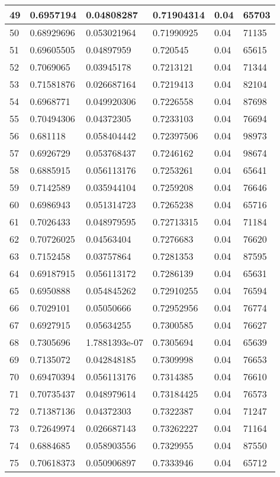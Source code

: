 \begin{longtable}{|l|l|l|l|l|l|}
49 & 0.6957194 & 0.04808287 & 0.71904314 & 0.04 & 65703 \\ \hline 
50 & 0.68929696 & 0.053021964 & 0.71990925 & 0.04 & 71135 \\ \hline 
51 & 0.69605505 & 0.04897959 & 0.720545 & 0.04 & 65615 \\ \hline 
52 & 0.7069065 & 0.03945178 & 0.7213121 & 0.04 & 71344 \\ \hline 
53 & 0.71581876 & 0.026687164 & 0.7219413 & 0.04 & 82104 \\ \hline 
54 & 0.6968771 & 0.049920306 & 0.7226558 & 0.04 & 87698 \\ \hline 
55 & 0.70494306 & 0.04372305 & 0.7233103 & 0.04 & 76694 \\ \hline 
56 & 0.681118 & 0.058404442 & 0.72397506 & 0.04 & 98973 \\ \hline 
57 & 0.6926729 & 0.053768437 & 0.7246162 & 0.04 & 98674 \\ \hline 
58 & 0.6885915 & 0.056113176 & 0.7253261 & 0.04 & 65641 \\ \hline 
59 & 0.7142589 & 0.035944104 & 0.7259208 & 0.04 & 76646 \\ \hline 
60 & 0.6986943 & 0.051314723 & 0.7265238 & 0.04 & 65716 \\ \hline 
61 & 0.7026433 & 0.048979595 & 0.72713315 & 0.04 & 71184 \\ \hline 
62 & 0.70726025 & 0.04563404 & 0.7276683 & 0.04 & 76620 \\ \hline 
63 & 0.7152458 & 0.03757864 & 0.7281353 & 0.04 & 87595 \\ \hline 
64 & 0.69187915 & 0.056113172 & 0.7286139 & 0.04 & 65631 \\ \hline 
65 & 0.6950888 & 0.054845262 & 0.72910255 & 0.04 & 76594 \\ \hline 
66 & 0.7029101 & 0.05050666 & 0.72952956 & 0.04 & 76774 \\ \hline 
67 & 0.6927915 & 0.05634255 & 0.7300585 & 0.04 & 76627 \\ \hline 
68 & 0.7305696 & 1.7881393e-07 & 0.7305694 & 0.04 & 65639 \\ \hline 
69 & 0.7135072 & 0.042848185 & 0.7309998 & 0.04 & 76653 \\ \hline 
70 & 0.69470394 & 0.056113176 & 0.7314385 & 0.04 & 76610 \\ \hline 
71 & 0.70735437 & 0.048979614 & 0.73184425 & 0.04 & 76573 \\ \hline 
72 & 0.71387136 & 0.04372303 & 0.7322387 & 0.04 & 71247 \\ \hline 
73 & 0.72649974 & 0.026687143 & 0.73262227 & 0.04 & 71164 \\ \hline 
74 & 0.6884685 & 0.058903556 & 0.7329955 & 0.04 & 87550 \\ \hline 
75 & 0.70618373 & 0.050906897 & 0.7333946 & 0.04 & 65712 \\ \hline 
\end{longtable}